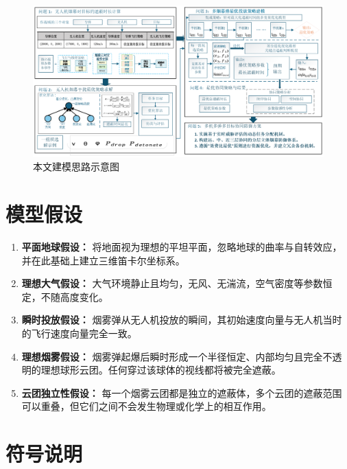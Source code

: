 \documentclass[fontset=SimSun]{ctexart}
\begin{document}
\begin{figure}[H]
    \centering
    \includegraphics[width=\textwidth]{9.全文流程图.png}
    \caption{本文建模思路示意图}
    \label{fig:obscuration_cases}
\end{figure}

\section{模型假设}

\begin{enumerate}[leftmargin=1cm]
    \item \textbf{平面地球假设：} 将地面视为理想的平坦平面，忽略地球的曲率与自转效应，并在此基础上建立三维笛卡尔坐标系。
    \item \textbf{理想大气假设：} 大气环境静止且均匀，无风、无湍流，空气密度等参数恒定，不随高度变化。
    \item \textbf{瞬时投放假设：} 烟雾弹从无人机投放的瞬间，其初始速度向量与无人机当时的飞行速度向量完全一致。
    \item \textbf{理想烟雾假设：} 烟雾弹起爆后瞬时形成一个半径恒定、内部均匀且完全不透明的理想球形云团。任何穿过该球体的视线都将被完全遮蔽。
    \item \textbf{云团独立性假设：} 每一个烟雾云团都是独立的遮蔽体，多个云团的遮蔽范围可以重叠，但它们之间不会发生物理或化学上的相互作用。
\end{enumerate}

\section{符号说明}
\end{document}
